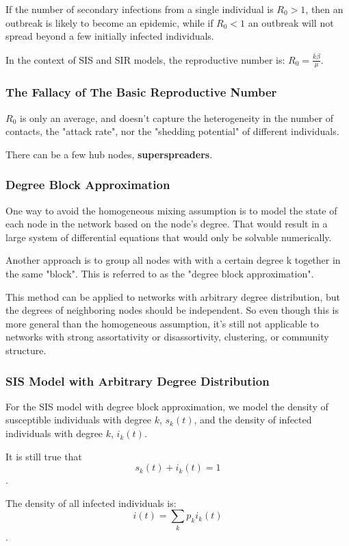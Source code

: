 \documentclass[11pt]{scrartcl} %
\begin{document}
If the number of secondary infections from a single individual is $R_0>1$, then an outbreak is likely to become an epidemic, while if $R_0<1$ an outbreak will not spread beyond a few initially infected individuals.

In the context of SIS and SIR models, the reproductive number is: $R_0 = \frac{\bar{k}\beta}{\mu}$.


\subsubsection{The Fallacy of The Basic Reproductive Number}
$R_0$ is only an average, and doesn't capture the heterogeneity in the number of contacts, the "attack rate", nor the "shedding potential" of different individuals. 

There can be a few hub nodes, \textbf{superspreaders}.

\subsubsection{Degree Block Approximation}
One way to avoid the homogeneous mixing assumption is to model the state of each node in the network based on the node's degree. That would result in a large system of differential equations that would only be solvable numerically.

Another approach is to group all nodes with with a certain degree k together in the same "block". This is referred to as the "degree block approximation".

This method can be applied to networks with arbitrary degree distribution, but the degrees of neighboring nodes should be independent. So even though this is more general than the homogeneous assumption, it's still not applicable to networks with strong assortativity or disassortivity, clustering, or community structure.

\subsubsection{SIS Model with Arbitrary Degree Distribution}
For the SIS model with degree block approximation, we model the density of susceptible individuals with degree $k$, $s_k(t)$, and the density of infected individuals with degree $k$, $i_k(t)$.

It is still true that \[ s_k(t) + i_k(t)=1 \]. 

The density of all infected individuals is:
\[ i(t) = \sum_k p_k i_k(t) \].
\end{document}
